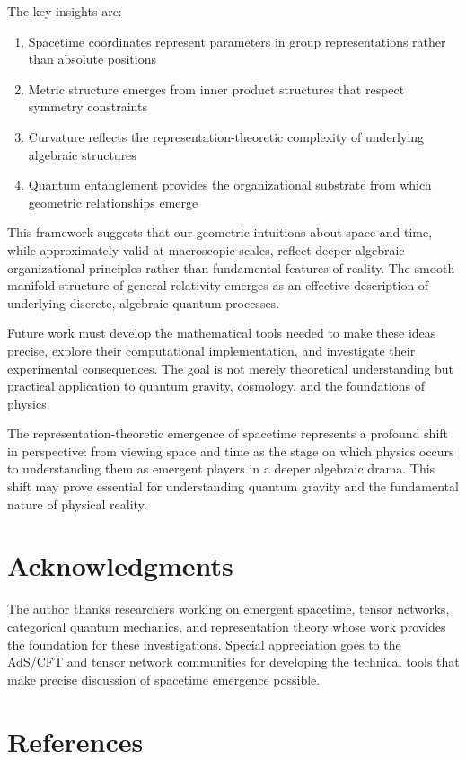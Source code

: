 \documentclass[12pt]{article}
\begin{document}
The key insights are:

\begin{enumerate}
\item Spacetime coordinates represent parameters in group representations rather than absolute positions
\item Metric structure emerges from inner product structures that respect symmetry constraints  
\item Curvature reflects the representation-theoretic complexity of underlying algebraic structures
\item Quantum entanglement provides the organizational substrate from which geometric relationships emerge
\end{enumerate}

This framework suggests that our geometric intuitions about space and time, while approximately valid at macroscopic scales, reflect deeper algebraic organizational principles rather than fundamental features of reality. The smooth manifold structure of general relativity emerges as an effective description of underlying discrete, algebraic quantum processes.

Future work must develop the mathematical tools needed to make these ideas precise, explore their computational implementation, and investigate their experimental consequences. The goal is not merely theoretical understanding but practical application to quantum gravity, cosmology, and the foundations of physics.

The representation-theoretic emergence of spacetime represents a profound shift in perspective: from viewing space and time as the stage on which physics occurs to understanding them as emergent players in a deeper algebraic drama. This shift may prove essential for understanding quantum gravity and the fundamental nature of physical reality.

\section*{Acknowledgments}

The author thanks researchers working on emergent spacetime, tensor networks, categorical quantum mechanics, and representation theory whose work provides the foundation for these investigations. Special appreciation goes to the AdS/CFT and tensor network communities for developing the technical tools that make precise discussion of spacetime emergence possible.

\section*{References}
\end{document}
